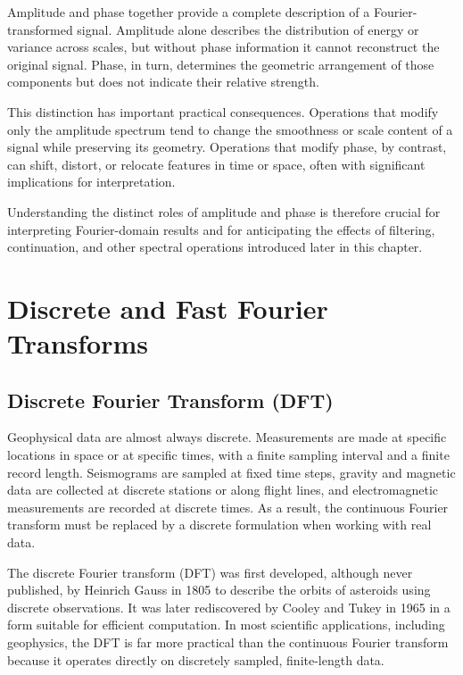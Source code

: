 Amplitude and phase together provide a complete description of a Fourier-transformed signal. Amplitude alone describes the distribution of energy or variance across scales, but without phase information it cannot reconstruct the original signal. Phase, in turn, determines the geometric arrangement of those components but does not indicate their relative strength.

This distinction has important practical consequences. Operations that modify only the amplitude spectrum tend to change the smoothness or scale content of a signal while preserving its geometry. Operations that modify phase, by contrast, can shift, distort, or relocate features in time or space, often with significant implications for interpretation.

Understanding the distinct roles of amplitude and phase is therefore crucial for interpreting Fourier-domain results and for anticipating the effects of filtering, continuation, and other spectral operations introduced later in this chapter.


\section{Discrete and Fast Fourier Transforms}

\subsection{Discrete Fourier Transform (DFT)}

Geophysical data are almost always discrete. Measurements are made at specific locations in space or at specific times, with a finite sampling interval and a finite record length. Seismograms are sampled at fixed time steps, gravity and magnetic data are collected at discrete stations or along flight lines, and electromagnetic measurements are recorded at discrete times. As a result, the continuous Fourier transform must be replaced by a discrete formulation when working with real data.

The discrete Fourier transform (DFT) was first developed, although never published, by Heinrich Gauss in 1805 to describe the orbits of asteroids using discrete observations. It was later rediscovered by Cooley and Tukey in 1965 in a form suitable for efficient computation. In most scientific applications, including geophysics, the DFT is far more practical than the continuous Fourier transform because it operates directly on discretely sampled, finite-length data.

